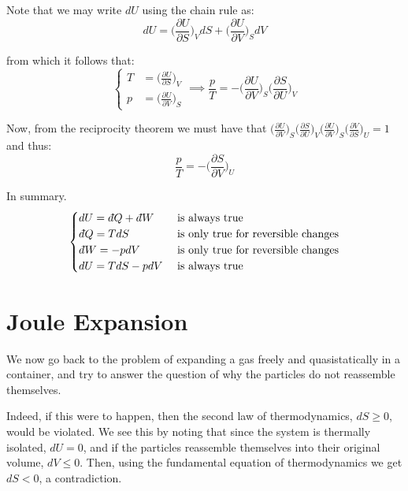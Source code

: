 \documentclass[a4paper,11pt,oneside]{book}
\newcommand{\dbar}{d\hspace*{-0.08em}\bar{}\hspace*{0.1em}}
\begin{document}
Note that we may write $dU$ using the chain rule as:
\begin{equation}
    dU = \bigg(\frac{\partial U}{\partial S}\bigg)_V dS + \big(\frac{\partial U}{\partial V}\big)_S dV
\end{equation}

from which it follows that:
\begin{equation}
    \begin{cases}
    T&= \big(\frac{\partial U}{\partial S}\big)_V\\
    p&=\big(\frac{\partial U}{\partial V}\big)_S
    \end{cases} \implies \frac{p}{T} = - \bigg(\frac{\partial U}{\partial V}\bigg)_S \bigg(\frac{\partial S}{\partial U}\bigg)_V
\end{equation}

Now, from the reciprocity theorem we must have that $\big(\frac{\partial U}{\partial V}\big)_S \big(\frac{\partial S}{\partial U}\big)_V \big(\frac{\partial U}{\partial V}\big)_S \big(\frac{\partial V}{\partial S}\big)_U=1$ and thus:
\begin{equation}
    \boxed{\frac{p}{T} = -\bigg(\frac{\partial S}{\partial V}\bigg)_U}
\end{equation}

In summary.
\begin{equation}
\begin{cases}
dU = \dbar Q+ \dbar W &\text{ is always true }\\
    \dbar Q = T dS &\text{ is only true for reversible changes}\\
    \dbar W = - pdV &\text{ is only true for reversible changes}\\
    dU = TdS - pdV & \text{ is always true}
\end{cases}
\end{equation}
\section{Joule Expansion}
We now go back to the problem of expanding a gas freely and quasistatically in a container, and try to answer the question of why the particles do not reassemble themselves. 

Indeed, if this were to happen, then the second law of thermodynamics, $dS \geq 0$, would be violated. We see this by noting that since the system is thermally isolated, $dU=0$, and if the particles reassemble themselves into their original volume, $dV \leq 0$. Then, using the fundamental equation of thermodynamics we get $dS < 0$, a contradiction. 
\end{document}
